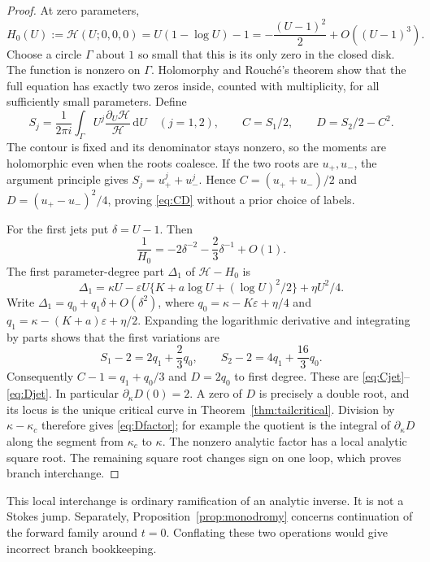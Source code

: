 \documentclass[11pt,a4paper]{article}
\numberwithin{equation}{section}
\theoremstyle{definition}\newtheorem{definition}[theorem]{Definition}
\theoremstyle{remark}\newtheorem{remark}[theorem]{Remark}
\newcommand{\dd}{\,\mathrm d}\newcommand{\eps}{\varepsilon}
\newcommand{\HH}{\mathcal H}
\begin{document}
\begin{proof}
At zero parameters,
\[
 H_0(U):=\HH(U;0,0,0)=U(1-\log U)-1
       =-\frac{(U-1)^2}{2}+O((U-1)^3).
\]
Choose a circle $\Gamma$ about $1$ so small that this is its only zero in
the closed disk. The function is nonzero on $\Gamma$. Holomorphy and
Rouch\'e's theorem show that the full equation has exactly two zeros
inside, counted with multiplicity, for all sufficiently small parameters.
Define
\[
 S_j=\frac1{2\pi i}\int_\Gamma U^j
               \frac{\partial_U\HH}{\HH}\dd U\quad(j=1,2),\qquad
 C=S_1/2,\qquad D=S_2/2-C^2.
\]
The contour is fixed and its denominator stays nonzero, so the moments
are holomorphic even when the roots coalesce. If the two roots are
$u_+,u_-$, the argument principle gives
$S_j=u_+^j+u_-^j$. Hence $C=(u_++u_-)/2$ and
$D=(u_+-u_-)^2/4$, proving \eqref{eq:CD} without a prior choice of labels.

For the first jets put $\delta=U-1$. Then
\[
 \frac1{H_0}=-2\delta^{-2}-\frac23\delta^{-1}+O(1).
\]
The first parameter-degree part $\Delta_1$ of $\HH-H_0$ is
\[
 \Delta_1=\kappa U-\eps U
       \{K+a\log U+(\log U)^2/2\}+\eta U^2/4.
\]
Write $\Delta_1=q_0+q_1\delta+O(\delta^2)$, where
$q_0=\kappa-K\eps+\eta/4$ and
$q_1=\kappa-(K+a)\eps+\eta/2$.
Expanding the logarithmic derivative and integrating by parts shows that
the first variations are
\[
 S_1-2=2q_1+\frac23q_0,\qquad
 S_2-2=4q_1+\frac{16}3q_0.
\]
Consequently $C-1=q_1+q_0/3$ and $D=2q_0$ to first degree. These are
\eqref{eq:Cjet}--\eqref{eq:Djet}. In particular $\partial_\kappa D(0)=2$.
A zero of $D$ is precisely a double root, and its locus is the unique
critical curve in Theorem~\ref{thm:tailcritical}. Division by
$\kappa-\kappa_c$ therefore gives \eqref{eq:Dfactor}; for example the
quotient is the integral of $\partial_\kappa D$ along the segment from
$\kappa_c$ to $\kappa$. The nonzero analytic factor has a local analytic
square root. The remaining square root changes sign on one loop, which
proves branch interchange.
\end{proof}

This local interchange is ordinary ramification of an analytic inverse.
It is not a Stokes jump. Separately, Proposition~\ref{prop:monodromy}
concerns continuation of the forward family around $t=0$. Conflating these
two operations would give incorrect branch bookkeeping.
\end{document}

